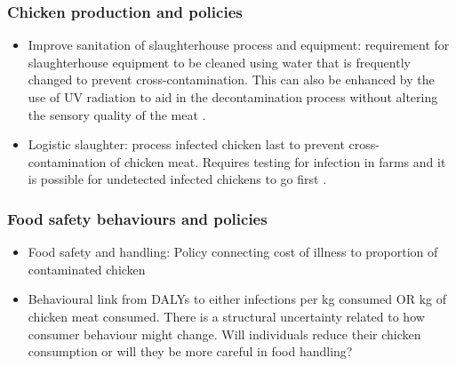 \subsubsection{Chicken production and policies}
\begin{itemize}
    \item Improve sanitation of slaughterhouse process and equipment: requirement for slaughterhouse equipment to be cleaned using water that is frequently changed to prevent cross-contamination. This can also be enhanced by the use of UV radiation to aid in the decontamination process without altering the sensory quality of the meat \parencite{isohanni_use_2009}.
    \item Logistic slaughter: process infected chicken last to prevent cross-contamination of chicken meat. Requires testing for infection in farms and it is possible for undetected infected chickens to go first \parencite{evers_predicted_2004}. 
\end{itemize}

\subsubsection{Food safety behaviours and policies}
\label{s:foodbehaviour}

\begin{itemize}
    \item Food safety and handling: Policy connecting cost of illness to proportion of contaminated chicken
    \item Behavioural link from DALYs to either infections per kg consumed OR kg of chicken meat consumed. There is a structural uncertainty related to how consumer behaviour might change. Will individuals reduce their chicken consumption or will they be more careful in food handling?
\end{itemize}